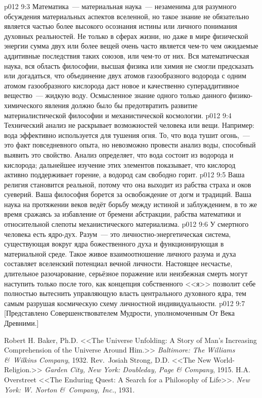 \vs p012 9:3 Математика~--- материальная наука~--- незаменима для разумного обсуждения материальных аспектов вселенной, но такое знание не обязательно является частью более высокого осознания истины или личного понимания духовных реальностей. Не только в сферах жизни, но даже в мире физической энергии сумма двух или более вещей очень часто является чем\hyp{}то  чем ожидаемые аддитивные последствия таких союзов, или чем\hyp{}то  от них. Вся математическая наука, вся область философии, высшая физика или химия не смогли предсказать или догадаться, что объединение двух атомов газообразного водорода с одним атомом газообразного кислорода даст новое и качественно супераддитивное вещество~--- жидкую воду. Осмысленное знание одного только данного физико\hyp{}химического явления должно было бы предотвратить развитие материалистической философии и механистической космологии.
\vs p012 9:4 Технический анализ не раскрывает возможностей человека или вещи. Например: вода эффективно используется для тушения огня. То, что вода тушит огонь,~--- это факт повседневного опыта, но невозможно провести анализ воды, способный выявить это свойство. Анализ определяет, что вода состоит из водорода и кислорода; дальнейшее изучение этих элементов показывает, что кислород активно поддерживает горение, а водород сам свободно горит.
\vs p012 9:5 Ваша религия становится реальной, потому что она выходит из рабства страха и оков суеверий. Ваша философия борется за освобождение от догм и традиций. Ваша наука на протяжении веков ведёт борьбу между истиной и заблуждением, в то же время сражаясь за избавление от бремени абстракции, рабства математики и относительной слепоты механистического материализма.
\vs p012 9:6 \pc У смертного человека есть ядро\hyp{}дух. Разум~--- это личностно\hyp{}энергетическая система, существующая вокруг ядра божественного духа и функционирующая в материальной среде. Такое живое взаимоотношение личного разума и духа составляет вселенский потенциал вечной личности. Настоящее несчастье, длительное разочарование, серьёзное поражение или неизбежная смерть могут наступить только после того, как концепция собственного <<я>> позволит себе полностью вытеснить управляющую власть центрального духовного ядра, тем самым разрушая космическую схему личностной индивидуальности.
\vsetoff
\vs p012 9:7 [Представлено Совершенствователем Мудрости, уполномоченным От Века Древними.]
\quizlink
\begin{thebibliography}{100}
Robert H. Baker, Ph.D.
{<<The Universe Unfolding: A Story of Man's Increasing Comprehension of the Universe Around Him.>>}
{\em Baltimore: The Williams \&\ Wilkins Company}, 1932.
Rev.~Josiah Strong, D.D.
{<<The New World\hyp{}Religion.>>}
{\em Garden City, New York: Doubleday, Page \& Company}, 1915.
H.A. Overstreet
{<<The Enduring Quest: A Search for a Philosophy of Life>>.}
{\em New York: W. Norton \&\ Company, Inc.}, 1931.
\end{thebibliography}

